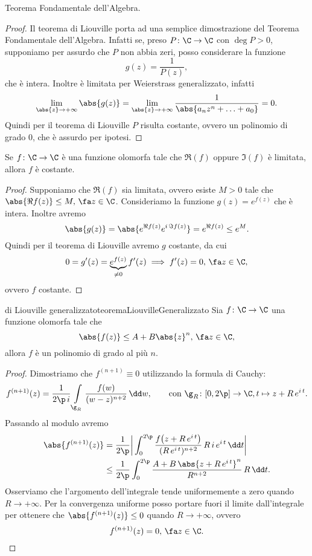 \begin{cor}
	Teorema Fondamentale dell'Algebra.
\end{cor}

\begin{proof}
	Il teorema di Liouville porta ad una semplice dimostrazione del Teorema Fondamentale dell'Algebra.
	Infatti se, preso \(P\colon \C \to \C\) con \(\deg P>0\), supponiamo per assurdo che \(P\) non abbia zeri, posso considerare la funzione
	\[
		g(z) = \frac{1}{P(z)},
	\]
	che è intera. Inoltre è limitata per Weierstrass generalizzato, infatti
	\[
		\lim_{\abs{z}\to +\infty} \abs{g(z)} = \lim_{\abs{z}\to+\infty} \frac{1}{\abs{a_n z^n+\ldots+a_0}} = 0.
	\]
	Quindi per il teorema di Liouville \(P\) risulta costante, ovvero un polinomio di grado \(0\), che è assurdo per ipotesi.
\end{proof}
%
%
\begin{cor}
	Se \(f\colon \C \to \C\) è una funzione olomorfa tale che \(\Re(f)\) oppure \(\Im(f)\) è limitata, allora \(f\) è costante.
\end{cor}

\begin{proof}
	Supponiamo che \(\Re(f)\) sia limitata, ovvero esiste \(M>0\) tale che \(\abs{\Re f(z)}\le M,\,\fa z\in \C\).
	Consideriamo la funzione \(g(z)=e^{f(z)}\) che è intera. Inoltre avremo
	\[
		\abs{g(z)} = \abs{e^{\Re f(z)}e^{i\,\Im f(z)}} = e^{\Re f(z)} \le e^M.
	\]
	Quindi per il teorema di Liouville avremo \(g\) costante, da cui
	\[
		0 = g'(z) = \underbrace{e^{f(z)}}_{\neq 0}f'(z) \implies f'(z)= 0,\,\fa z\in\C,
	\]
	ovvero \(f\) costante.
\end{proof}

\begin{teor}{di Liouville generalizzato}{teoremaLiouvilleGeneralizzato}
	Sia \(f\colon \C \to \C\) una funzione olomorfa tale che
	\[
		\abs{f(z)} \le A + B\abs{z}^n,\,\fa z\in\C,
	\]
	allora \(f\) è un polinomio di grado al più \(n\).
\end{teor}

\begin{proof}
	Dimostriamo che \(f^{(n+1)}\equiv 0\) utilizzando la formula di Cauchy:
	\[
		f^{(n+1)}(z) = \frac{1}{2\p\,i}\int\limits_{\g_R} \frac{f(w)}{(w-z)^{n+2}}\,\dd w, \qquad\text{con } \g_R\colon [0,2\p] \to \C, t\mapsto z+R\,e^{i\,t}.
	\]
	Passando al modulo avremo
	\[
		\begin{split}
			\abs{f^{(n+1)}(z)} & = \frac{1}{2\p} \bigg\lvert \int_0^{2\p} \frac{f\big(z+R\,e^{i\,t}\big)}{(R\,e^{i\,t})^{n+2}}\,R\,i\,e^{i\,t}\,\dd t\bigg\rvert\\
			& \le \frac{1}{2\p} \int_0^{2\p} \frac{A+B\,\abs{z+R\,e^{i\,t}}^n}{R^{n+2}}\,R\,\dd t.
		\end{split}
	\]
	Osserviamo che l'argomento dell'integrale tende uniformemente a zero quando \(R\to+\infty\).
	Per la convergenza uniforme posso portare fuori il limite dall'integrale per ottenere che \(\abs{f^{(n+1)}(z)}\le 0\) quando \(R\to+\infty\), ovvero
	\[
		f^{(n+1)}(z) = 0,\,\fa z\in \C.\qedhere
	\]
\end{proof}

